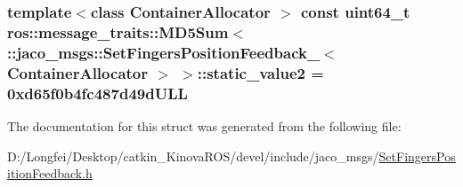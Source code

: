\subsubsection[{\texorpdfstring{static\+\_\+value2}{static_value2}}]{\setlength{\rightskip}{0pt plus 5cm}template$<$class Container\+Allocator $>$ const uint64\+\_\+t ros\+::message\+\_\+traits\+::\+M\+D5\+Sum$<$ \+::{\bf jaco\+\_\+msgs\+::\+Set\+Fingers\+Position\+Feedback\+\_\+}$<$ Container\+Allocator $>$ $>$\+::static\+\_\+value2 = 0xd65f0b4fc487d49d\+U\+LL\hspace{0.3cm}{\ttfamily [static]}}\hypertarget{structros_1_1message__traits_1_1MD5Sum_3_01_1_1jaco__msgs_1_1SetFingersPositionFeedback___3_01ContainerAllocator_01_4_01_4_a15005f3d97042d08fd0c0627128b92d7}{}\label{structros_1_1message__traits_1_1MD5Sum_3_01_1_1jaco__msgs_1_1SetFingersPositionFeedback___3_01ContainerAllocator_01_4_01_4_a15005f3d97042d08fd0c0627128b92d7}


The documentation for this struct was generated from the following file\+:\begin{DoxyCompactItemize}
\item 
D\+:/\+Longfei/\+Desktop/catkin\+\_\+\+Kinova\+R\+O\+S/devel/include/jaco\+\_\+msgs/\hyperlink{SetFingersPositionFeedback_8h}{Set\+Fingers\+Position\+Feedback.\+h}\end{DoxyCompactItemize}
